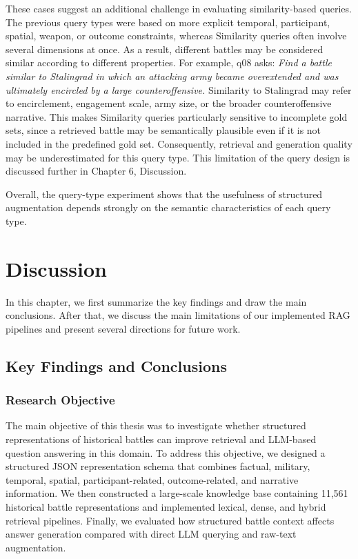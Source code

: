 These cases suggest an additional challenge in evaluating similarity-based queries. The previous query types were based on more explicit temporal, participant, spatial, weapon, or outcome constraints, whereas Similarity queries often involve several dimensions at once. As a result, different battles may be considered similar according to different properties. For example, q08 asks: \textit{Find a battle similar to Stalingrad in which an attacking army became overextended and was ultimately encircled by a large counteroffensive.} Similarity to Stalingrad may refer to encirclement, engagement scale, army size, or the broader counteroffensive narrative. This makes Similarity queries particularly sensitive to incomplete gold sets, since a retrieved battle may be semantically plausible even if it is not included in the predefined gold set. Consequently, retrieval and generation quality may be underestimated for this query type. This limitation of the query design is discussed further in Chapter 6, Discussion.

Overall, the query-type experiment shows that the usefulness of structured augmentation depends strongly on the semantic characteristics of each query type.
\chapter{Discussion}
In this chapter, we first summarize the key findings and draw the main conclusions. After that, we discuss the main limitations of our implemented RAG pipelines and present several directions for future work.
\section{Key Findings and Conclusions}
\subsection{Research Objective}
The main objective of this thesis was to investigate whether structured representations of historical battles can improve retrieval and LLM-based question answering in this domain. To address this objective, we designed a structured JSON representation schema that combines factual, military, temporal, spatial, participant-related, outcome-related, and narrative information. We then constructed a large-scale knowledge base containing 11,561 historical battle representations and implemented lexical, dense, and hybrid retrieval pipelines. Finally, we evaluated how structured battle context affects answer generation compared with direct LLM querying and raw-text augmentation.

